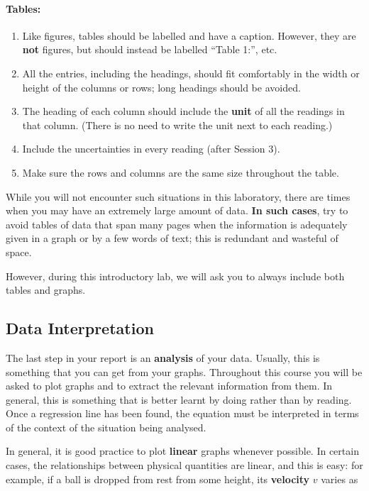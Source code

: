 \paragraph{Tables:}

\begin{enumerate}
    \item Like figures, tables should be labelled and have a caption. However, they are \textbf{not} figures, but should instead be labelled ``Table 1:'', etc.
    \item All the entries, including the headings, should fit comfortably in the width or height of the columns or rows; long headings should be avoided. 
    \item The heading of each column should include the \textbf{unit} of all the readings in that column. (There is no need to write the unit next to each reading.)
    \item Include the uncertainties in every reading (after Session 3).
    \item Make sure the rows and columns are the same size throughout the table.
\end{enumerate}

\begin{imp}
While you will not encounter such situations in this laboratory, there are times when you may have an extremely large amount of data. \textbf{In such cases}, try to avoid tables of data that span many pages when the information is adequately given in a graph or by a few words of text; this is redundant and wasteful of space. 

However, during this introductory lab, we will ask you to always include both tables and graphs.
\end{imp}

\subsection{Data Interpretation}

The last step in your report is an \textbf{analysis} of your data. Usually, this is something that you can get from your graphs. Throughout this course you will be asked to plot graphs and to extract the relevant information from them. In general, this is something that is better learnt by doing rather than by reading.  Once a regression line has been found, the equation must be interpreted in terms of the context of the situation being analysed.

In general, it is good practice to plot \textbf{linear} graphs whenever possible. In certain cases, the relationships between physical quantities are linear, and this is easy: for example, if a ball is dropped from rest from some height, its \textbf{velocity} $v$ varies as

